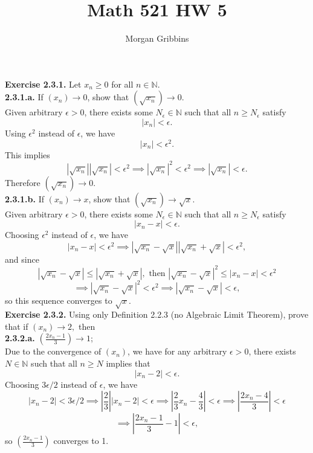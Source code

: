 \documentclass[12pt,letterpaper]{article}
\title{Math 521 HW 5}
\author{Morgan Gribbins}
\date{}
\begin{document}
	
\maketitle

\textbf{Exercise 2.3.1.} Let \(x_{n} \geq 0\) for all \(n \in \mathbb{N}\). \\

\textbf{2.3.1.a.} If \((x_{n}) \to 0\), show that \( ( \sqrt{x_{n}} ) \to 0\). \\

Given arbitrary \(\epsilon > 0\), there exists some \(N_{\epsilon} \in \mathbb{N}\) such that all \(n \geq N_{\epsilon}\) satisfy \[|x_{n}| < \epsilon.\] Using \(\epsilon^{2}\) instead of \(\epsilon\), we have \[|x_{n} | < \epsilon^{2}.\] This implies \[|\sqrt{x_{n}}||\sqrt{x_{n}}| < \epsilon^{2} \implies |\sqrt{x_{n}}|^{2} < \epsilon^{2} \implies  |\sqrt{x_{n}}| < \epsilon.\] Therefore \((\sqrt{x_{n}})\to 0\). \\

\textbf{2.3.1.b.} If \((x_{n}) \to x\), show that \((\sqrt{x_{n}}) \to \sqrt{x}\). \\

Given arbitrary \(\epsilon > 0\), there exists some \(N_{\epsilon} \in \mathbb{N}\) such that all \(n \geq N_{\epsilon}\) satisfy \[|x_{n} - x| < \epsilon.\] Choosing \(\epsilon^{2}\) instead of \(\epsilon\), we have \[|x_{n} - x| < \epsilon^{2} \implies |\sqrt{x_{n}}-\sqrt{x}||\sqrt{x_{n}} + \sqrt{x}| < \epsilon^{2},\] and since \[|\sqrt{x_{n}} - \sqrt{x}| \leq |\sqrt{x_{n}} + \sqrt{x}|, \text{ then } |\sqrt{x_{n}} - \sqrt{x}|^{2} \leq |x_{n} - x| < \epsilon^{2}\] \[\implies |\sqrt{x_{n}} - \sqrt{x}|^{2} < \epsilon^{2} \implies |\sqrt{x_{n}} - \sqrt{x}| < \epsilon,\] so this sequence converges to \(\sqrt{x}\). \\

\textbf{Exercise 2.3.2.} Using only Definition 2.2.3 (no Algebraic Limit Theorem), prove that if \((x_{n}) \to 2, \) then \\

\textbf{2.3.2.a.} \((\frac{2x_{n}-1}{3}) \to 1\); \\

Due to the convergence of \((x_{n})\), we have for any arbitrary \(\epsilon > 0\), there exists \(N \in \mathbb{N}\) such that all \(n \geq N\) implies that \[|x_{n} - 2| < \epsilon.\] Choosing \(3\epsilon/2\) instead of \(\epsilon\), we have \[|x_{n} - 2| < 3\epsilon/2 \implies \left|\frac{2}{3}\right||x_{n} - 2| < \epsilon \implies \left|\frac{2}{3}x_{n} - \frac{4}{3}\right| < \epsilon \implies \left|\frac{2x_{n}-4}{3}\right| < \epsilon\] \[\implies \left|\frac{2x_{n}-1}{3} -1\right| < \epsilon,\] so \(\left(\frac{2x_{n}-1}{3} \right)\) converges to 1. \\
\end{document}
